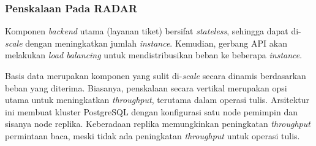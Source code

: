 \subsubsection{Penskalaan Pada RADAR}

Komponen \textit{backend} utama (layanan tiket) bersifat \textit{stateless}, sehingga dapat di-\textit{scale} dengan meningkatkan jumlah \textit{instance}. Kemudian, gerbang API akan melakukan \textit{load balancing} untuk mendistribusikan beban ke beberapa \textit{instance}.

Basis data merupakan komponen yang sulit di-\textit{scale} secara dinamis berdasarkan beban yang diterima. Biasanya, penskalaan secara vertikal merupakan opsi utama untuk meningkatkan \textit{throughput}, terutama dalam operasi tulis. Arsitektur ini membuat kluster PostgreSQL dengan konfigurasi satu node pemimpin dan sisanya node replika. Keberadaan replika memungkinkan peningkatan \textit{throughput} permintaan baca, meski tidak ada peningkatan \textit{throughput} untuk operasi tulis.